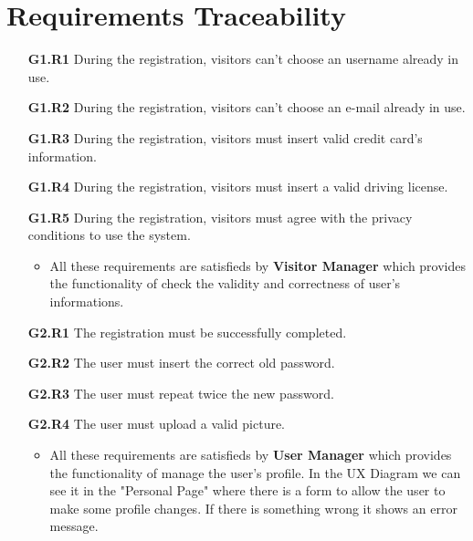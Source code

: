 \section{Requirements Traceability} \label{sec:req-trac}


\begin{itemize}
\item[\textbf{G1.R1}] During the registration, visitors can't choose an username already in use.
\item[\textbf{G1.R2}] During the registration, visitors can't choose an e-mail already in use.
\item[\textbf{G1.R3}] During the registration, visitors must insert valid credit card's information.
\item[\textbf{G1.R4}] During the registration, visitors must insert a valid driving license.
\item[\textbf{G1.R5}] During the registration, visitors must agree with the privacy conditions to use the system.
\begin{itemize}
\item All these requirements are satisfieds by \textbf{Visitor Manager} which provides the functionality of check the validity and correctness of user's informations.
\end{itemize}

\item[\textbf{G2.R1}] The registration must be successfully completed.
\item[\textbf{G2.R2}] The user must insert the correct old password.
\item[\textbf{G2.R3}] The user must repeat twice the new password.
\item[\textbf{G2.R4}] The user must upload a valid picture.
\begin{itemize}
\item All these requirements are satisfieds by \textbf{User Manager} which provides the functionality of manage the user's profile. In the UX Diagram we can see it in the "Personal Page" where there is a form to allow the user to make some profile changes. If there is something wrong it shows an error message.
\end{itemize}


\end{itemize}
